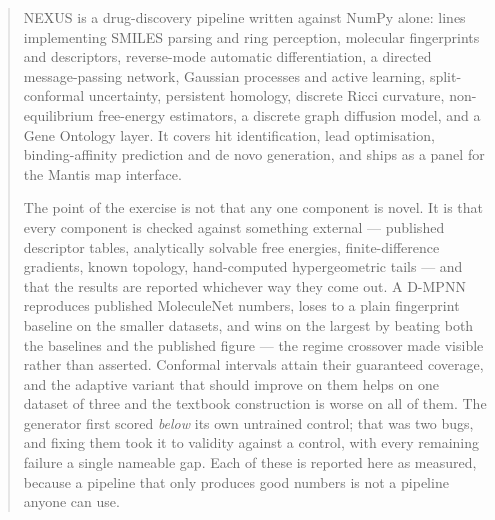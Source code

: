 \begin{abstract}
\noindent
NEXUS is a drug-discovery pipeline written against NumPy alone: \codeLines{} lines
implementing SMILES parsing and ring perception, molecular fingerprints and
descriptors, reverse-mode automatic differentiation, a directed message-passing
network, Gaussian processes and active learning, split-conformal uncertainty,
persistent homology, discrete Ricci curvature, non-equilibrium free-energy
estimators, a discrete graph diffusion model, and a Gene Ontology layer. It covers
hit identification, lead optimisation, binding-affinity prediction and de novo
generation, and ships as a panel for the Mantis map interface.

The point of the exercise is not that any one component is novel. It is that every
component is checked against something external --- published descriptor tables,
analytically solvable free energies, finite-difference gradients, known topology,
hand-computed hypergeometric tails --- and that the results are reported whichever
way they come out. A D-MPNN reproduces published MoleculeNet numbers, loses to a plain
fingerprint baseline on the smaller datasets, and wins on the largest by beating both
the baselines and the published figure --- the regime crossover made visible rather
than asserted. Conformal intervals attain their
guaranteed coverage, and the adaptive variant that should improve on them helps on
one dataset of three and the textbook construction is worse on all of them. The
generator first scored \emph{below} its own untrained control; that was two bugs, and
fixing them took it to \genModelValidity{} validity against a \genBaselineValidity{}
control, with every remaining failure a single nameable gap. Each of these is reported here as measured,
because a pipeline that only produces good numbers is not a pipeline anyone can use.
\end{abstract}

